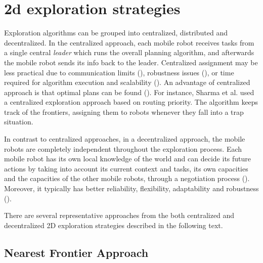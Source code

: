 \section{2d exploration strategies}

Exploration algorithms can be grouped into centralized, distributed and decentralized. In the  centralized approach, each mobile robot receives tasks from a single central \emph{leader} which runs the overall planning algorithm, and afterwards the mobile robot sends its info back to the leader. Centralized assignment may be less practical due to communication limits (\cite{Dias2000}), robustness issues (\cite{Dias2006}), or time required for algorithm execution and scalability (\cite{Julia2012}). An advantage of centralized approach is that optimal plans can be found (\cite{Yan2011}). For instance, Sharma et al. \cite{SharmaHonc2016} used a centralized exploration approach based on routing priority. The algorithm keeps track of the frontiers, assigning them to robots  whenever they fall into a trap situation.

In contrast to centralized approaches, in a decentralized approach, the mobile robots are completely independent throughout the exploration process. Each mobile robot has its own local knowledge of the world and can decide its future actions by taking into account its current context and tasks, its own capacities and the capacities of the other mobile robots, through a negotiation process (\cite{Yan2013}). Moreover, it typically has better reliability, flexibility, adaptability and robustness (\cite{Zlot2002}). 
 
There are several representative approaches from the both centralized and decentralized 2D exploration strategies described in the following text. 


\subsection{Nearest Frontier Approach} 

